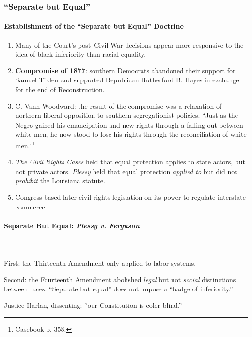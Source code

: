 \subsubsection{``Separate but Equal''}

\paragraph{Establishment of the ``Separate but Equal'' Doctrine}

\begin{enumerate}
    \item Many of the Court's post--Civil War decisions appear more 
    responsive to the idea of black inferiority than racial equality.
    \item \textbf{Compromise of 1877}: southern Democrats abandoned their 
    support for Samuel Tilden and supported Republican Rutherford B. Hayes in 
    exchange for the end of Reconstruction.
    \item C. Vann Woodward: the result of the compromise was a relaxation of 
    northern liberal opposition to southern segregationist policies. ``Just as 
    the Negro gained his emancipation and new rights through a falling out 
    between white men, he now stood to lose his rights through the 
    reconciliation of white men.''\footnote{Casebook p. 358.}
    \item \emph{The Civil Rights Cases} held that equal protection applies to 
    state actors, but not private actors. \emph{Plessy} held that equal 
    protection \emph{applied to} but did not \emph{prohibit} the Louisiana 
    statute.
    \item Congress based later civil rights legislation on its power to 
    regulate interstate commerce.
\end{enumerate}

\paragraph{Separate But Equal: \emph{Plessy v. Ferguson}}
~\\\\
First: the Thirteenth Amendment only applied to labor systems.

Second: the Fourteenth Amendment abolished \emph{legal} but not \emph{social} 
distinctions between races. ``Separate but equal'' does not impose a ``badge 
of inferiority.''

Justice Harlan, dissenting: ``our Constitution is color-blind.''

